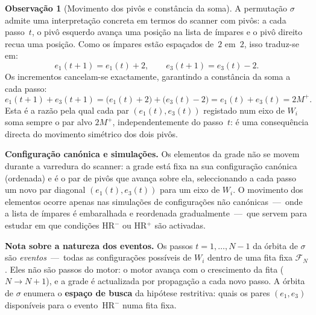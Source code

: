 \documentclass[12pt, a4paper]{article}
\theoremstyle{plain}
\theoremstyle{definition}
\newtheorem{remark}[theorem]{Observação}
\theoremstyle{remark}
\begin{document}
	\begin{remark}[Movimento dos pivôs e constância da soma]
		\label{rem:sigma-direcoes}
		A permutação $\sigma$ admite uma interpretação concreta em termos
		do scanner com pivôs: a cada passo~$t$, o pivô esquerdo avança
		uma posição na lista de ímpares e o pivô direito recua uma
		posição.  Como os ímpares estão espaçados de~$2$ em~$2$, isso
		traduz-se em:
		\[
		e_1(t{+}1)=e_1(t)+2,
		\qquad
		e_3(t{+}1)=e_3(t)-2.
		\]
		Os incrementos cancelam-se exactamente, garantindo a constância
		da soma a cada passo:
		\[
		e_1(t{+}1)+e_3(t{+}1)
		=\bigl(e_1(t)+2\bigr)+\bigl(e_3(t)-2\bigr)
		=e_1(t)+e_3(t)=2M^+.
		\]
		Esta é a razão pela qual cada par $(e_1(t),e_3(t))$ registado
		num eixo de $W_i$ soma sempre o par alvo $2M^+$,
		independentemente do passo~$t$: é uma consequência directa do
		movimento simétrico dos dois pivôs.
		
		\medskip
		\noindent\textbf{Configuração canónica e simulações.}
		Os elementos da grade não se movem durante a varredura do
		scanner: a grade está fixa na sua configuração canónica (ordenada)
		e é o par de pivôs que avança sobre ela, seleccionando a cada
		passo um novo par diagonal $(e_1(t),e_3(t))$ para um eixo de
		$W_i$.  O movimento dos elementos ocorre apenas nas simulações
		de configurações não canónicas~---~onde a lista de ímpares é
		embaralhada e reordenada gradualmente~---~que servem para
		estudar em que condições HR$^-$ ou HR$^+$ são activadas.
		
		\medskip
		\noindent\textbf{Nota sobre a natureza dos eventos.}
		Os passos $t=1,\ldots,N-1$ da órbita de $\sigma$ são
		\emph{eventos}~---~todas as configurações possíveis de $W_i$
		dentro de uma fita fixa $\mathcal{F}_N$.  Eles não são passos
		do motor: o motor avança com o crescimento da fita
		($N\to N{+}1$), e a grade é actualizada por propagação a cada
		novo passo.  A órbita de $\sigma$ enumera o
		\textbf{espaço de busca} da hipótese restritiva: quais os pares
		$(e_1,e_3)$ disponíveis para o evento~HR$^-$ numa fita fixa.
	\end{remark}
	
\end{document}
